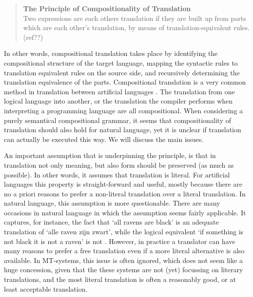 \documentclass{report}
\theoremstyle{definition}
\theoremstyle{plain}
\begin{document}
\begin{quote}
\textbf{The Principle of Compositionality of Translation}\\
Two expressions are each others translation if they are built up from parts which are each other's translation, by means of translation-equivalent rules. (ref??)
\end{quote}

In other words, compositional translation takes place by identifying the compositional structure of the target language, mapping the syntactic rules to translation equivalent rules on the source side, and recursively determining the translation equivalence of the parts. Compositional translation is a very common method in translation between artificial languages \citep{janssen1996compositionality,janssen1998algebraic}. The translation from one logical language into another, or the translation the compiler performs when interpreting a programming language are all compositional. When considering a purely semantical compositional grammar, it seems that compositionality of translation should also hold for natural language, yet it is unclear if translation can actually be executed this way. We will discuss the main issues.

An important assumption that is underpinning the principle, is that in translation not only meaning, but also form should be preserved (as much as possible). In other words, it assumes that translation is literal. For artificial languages this property is straight-forward and useful, mostly because there are no a priori reasons to prefer a non-literal translation over a literal translation. In natural language, this assumption is more questionable. There are many occasions in natural language in which the assumption seems fairly applicable. It captures, for instance, the fact that `all ravens are black' is an adequate translation of `alle raven zijn zwart', while the logical equivalent `if something is not black it is not a raven' is not \citep{landsbergen1989power}. However, in practice a translator can have many reasons to prefer a free translation even if a more literal alternative is also available. In MT-systems, this issue is often ignored, which does not seem like a huge concession, given that the these systems are not (yet) focussing on literary translations, and the most literal translation is often a reasonably good, or at least acceptable translation.
\end{document}
